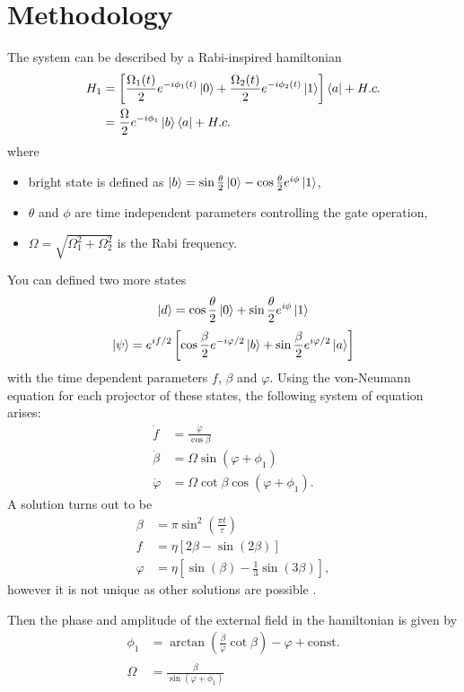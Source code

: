 \documentclass[%
reprint,
amsmath,amssymb,
aps,
]{revtex4-2}
\begin{document}
\section{Methodology}
\label{sec:Methodology}
The system can be described by a Rabi-inspired hamiltonian 
\begin{align*}
  H_1 &= \left[
    \frac{\Omega_1(t)}{2} e^{-i\phi_1(t)} \ket{0} + \frac{\Omega_2(t)}{2} e^{-i\phi_2(t)}
  \ket{1} \right] \bra{a} + H.c. \\
      &= \frac{\Omega}{2} e^{-i\phi_1} \ket{b}\bra{a} + H.c.
\end{align*}
where
\begin{itemize}
  \item bright state is defined as $\ket{b} = \sin\frac{\theta}{2} \ket{0} - \cos\frac{\theta}{2}
    e^{i\phi} \ket{1}$,
  \item $\theta$ and $\phi$ are time independent parameters controlling the gate operation,
  \item $\Omega = \sqrt{\Omega_1^2 + \Omega_2^2}$ is the Rabi frequency.
\end{itemize}
You can defined two more states
\[
  \ket{d} = \cos\frac{\theta}{2} \ket{0} + \sin\frac{\theta}{2} e^{i\phi} \ket{1}
\]
\[
  \ket{\psi} = e^{if/2} \left[ \cos\frac{\beta}{2} e^{-i\varphi/2} \ket{b} + \sin\frac{\beta}{2}
  e^{i\varphi/2} \ket{a} \right]
\]
with the time dependent parameters $f$, $\beta$ and $\varphi$. Using the von-Neumann equation for
each projector of these states, the following system of equation arises:
\begin{align*}
  \dot f        &= \frac{\dot \varphi}{\cos \beta} \\
  \dot \beta    &= \Omega \sin(\varphi + \phi_1)  \\
  \dot \varphi  &= \Omega \cot\beta \cos(\varphi + \phi_1).
\end{align*}
A solution turns out to be
\begin{align*}
  \beta   &= \pi \sin^2\left(\frac{\pi t}{\tau} \right) \\
  f       &= \eta \left[2\beta - \sin(2\beta) \right] \\
  \varphi &= \eta \left[\sin(\beta) - \frac{1}{3} \sin(3\beta) \right],
\end{align*}
however it is not unique as other solutions are possible
\cite{https://doi.org/10.1002/qute.202000001}.

Then the phase and amplitude of the external field in the hamiltonian is given by
\begin{align}
  \phi_1 &= \arctan\left(\frac{\dot \beta}{\dot \varphi} \cot\beta\right) - \varphi +
  \text{const.} \\
  \Omega &= \frac{\dot \beta}{\sin(\varphi + \phi_1)}
  \label{eqn:params}
\end{align}
\end{document}
